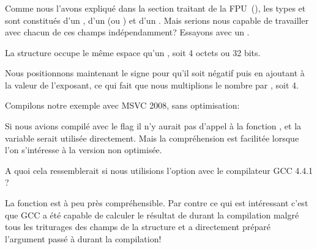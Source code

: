 ﻿\subsubsection{\WorkingWithFloatAsWithStructSubSubSectionName}
\label{sec:floatasstruct}

Comme nous l'avons expliqué dans la section traitant de la FPU~(), les types \Tfloat et 
\Tdouble sont constitués d'un , d'un  (ou ) et d'un .
Mais serions nous capable de travailler avec chacun de ces champs indépendamment? Essayons avec un \Tfloat.





La structure  occupe le même espace qu'un \Tfloat, soit 4 octets ou 32 bits.

Nous positionnons maintenant le signe pour qu'il soit négatif puis en ajoutant à la valeur de l'exposant, 
ce qui fait que nous multiplions le nombre par , soit 4.

Compilons notre exemple avec MSVC 2008, sans optimisation:



Si nous avions compilé avec le flag \Ox il n'y aurait pas d'appel à la fonction , et la variable 
 serait utilisée directement. Mais la compréhension est facilitée lorsque l'on s'intéresse à la version 
non optimisée.

A quoi cela ressemblerait si nous utilisions l'option \Othree avec le compilateur GCC 4.4.1 ?



La fonction \ttf est à peu près compréhensible. Par contre ce qui est intéressant c'est que GCC a été 
capable de calculer le résultat de  durant la compilation malgré tous les triturages des champs 
de la structure et a directement préparé l'argument passé à \printf{} durant la compilation!
